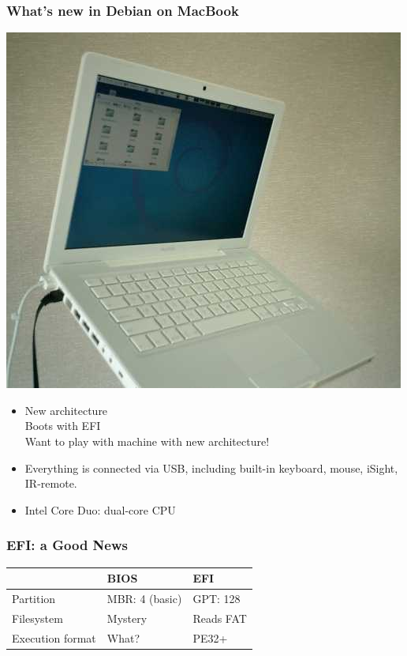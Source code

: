 \documentclass[cjk,dvipdfm]{beamer}
\begin{document}
\begin{frame}
\frametitle{What's new in Debian on MacBook}
\begin{center}

\begin{minipage}[b]{0.3\hsize}
 \includegraphics[width=1\hsize]{image200607/macbook.png}
\end{minipage}
\begin{minipage}[b]{0.6\hsize}
  \begin{itemize}
   \item New architecture\\
	 Boots with EFI\\
	 Want to play with machine with new architecture!
   \item Everything is connected via USB, including built-in keyboard,
	mouse, iSight, IR-remote.
   \item Intel Core Duo: dual-core CPU
 \end{itemize}
\end{minipage}

\end{center}
\end{frame}

\begin{frame}
\frametitle{EFI: a Good News}

\begin{tabular}[t]{|p{8em}|p{8em}|p{8em}|}
\hline
 & BIOS & EFI \\
\hline
Partition & MBR: 4 (basic) & GPT: 128 \\
\hline
Filesystem & Mystery & Reads FAT \\
\hline
Execution format & What? & PE32+ \\
\hline
\end{tabular}
\end{frame}
\end{document}
